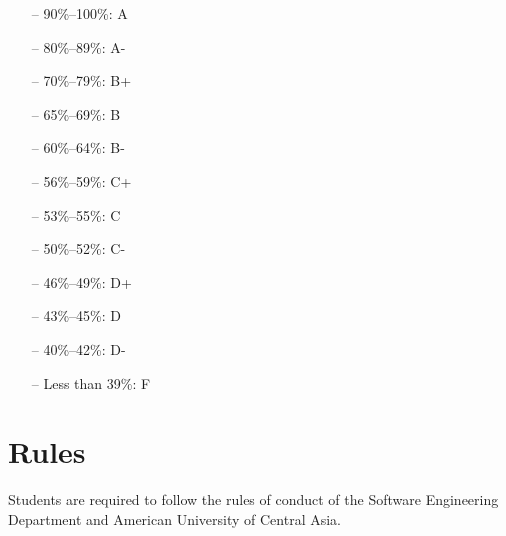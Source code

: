 \documentclass[12pt,a4paper,oneside]{article}
\begin{document}
        \begin{itemize} \itemsep-10pt \parskip0pt 
            \item[--] 90\%--100\%: A\\
            \item[--] 80\%--89\%: A-\\
            \item[--] 70\%--79\%: B+\\
            \item[--] 65\%--69\%: B\\
            \item[--] 60\%--64\%: B-\\
            \item[--] 56\%--59\%: C+\\
            \item[--] 53\%--55\%: C\\
            \item[--] 50\%--52\%: C-\\
            \item[--] 46\%--49\%: D+\\
            \item[--] 43\%--45\%: D\\
            \item[--] 40\%--42\%: D-\\
            \item[--] Less than 39\%: F
        \end{itemize}

    \section{Rules}

        Students are required to follow the rules of conduct of the Software
        Engineering Department and American University of Central Asia.
\end{document}
